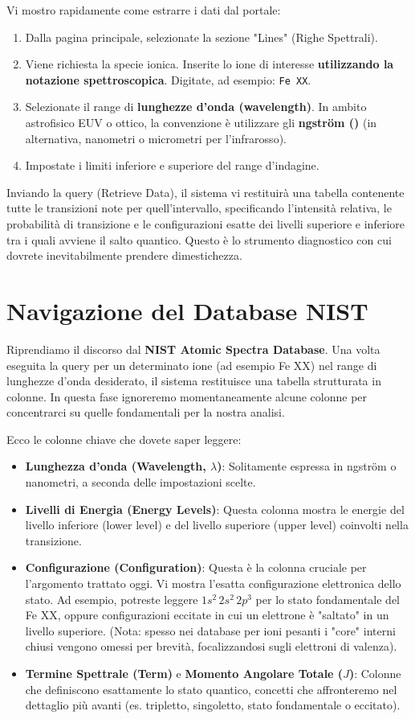 Vi mostro rapidamente come estrarre i dati dal portale:
\begin{enumerate}
\item Dalla pagina principale, selezionate la sezione "Lines" (Righe Spettrali).
\item Viene richiesta la specie ionica. Inserite lo ione di interesse \textbf{utilizzando la notazione spettroscopica}. Digitate, ad esempio: \texttt{Fe XX}.
\item Selezionate il range di \textbf{lunghezze d'onda (wavelength)}. In ambito astrofisico EUV o ottico, la convenzione è utilizzare gli \textbf{\text{\AA}ngström (\text{\AA})} (in alternativa, nanometri o micrometri per l'infrarosso).
\item Impostate i limiti inferiore e superiore del range d'indagine.
\end{enumerate}
Inviando la query (Retrieve Data), il sistema vi restituirà una tabella contenente tutte le transizioni note per quell'intervallo, specificando l'intensità relativa, le probabilità di transizione e le configurazioni esatte dei livelli superiore e inferiore tra i quali avviene il salto quantico. Questo è lo strumento diagnostico con cui dovrete inevitabilmente prendere dimestichezza.

\section{Navigazione del Database NIST}

Riprendiamo il discorso dal \textbf{NIST Atomic Spectra Database}. Una volta eseguita la query per un determinato ione (ad esempio Fe XX) nel range di lunghezze d'onda desiderato, il sistema restituisce una tabella strutturata in colonne.
In questa fase ignoreremo momentaneamente alcune colonne per concentrarci su quelle fondamentali per la nostra analisi.

Ecco le colonne chiave che dovete saper leggere:
\begin{itemize}
\item \textbf{Lunghezza d'onda (Wavelength, $\lambda$)}: Solitamente espressa in \text{\AA}ngström o nanometri, a seconda delle impostazioni scelte.
\item \textbf{Livelli di Energia (Energy Levels)}: Questa colonna mostra le energie del livello inferiore (lower level) e del livello superiore (upper level) coinvolti nella transizione.
\item \textbf{Configurazione (Configuration)}: Questa è la colonna cruciale per l'argomento trattato oggi. Vi mostra l'esatta configurazione elettronica dello stato. Ad esempio, potreste leggere $1s^2\, 2s^2\, 2p^3$ per lo stato fondamentale del Fe XX, oppure configurazioni eccitate in cui un elettrone è "saltato" in un livello superiore. (Nota: spesso nei database per ioni pesanti i "core" interni chiusi vengono omessi per brevità, focalizzandosi sugli elettroni di valenza).
\item \textbf{Termine Spettrale (Term)} e \textbf{Momento Angolare Totale ($J$)}: Colonne che definiscono esattamente lo stato quantico, concetti che affronteremo nel dettaglio più avanti (es. tripletto, singoletto, stato fondamentale o eccitato).
\end{itemize}

